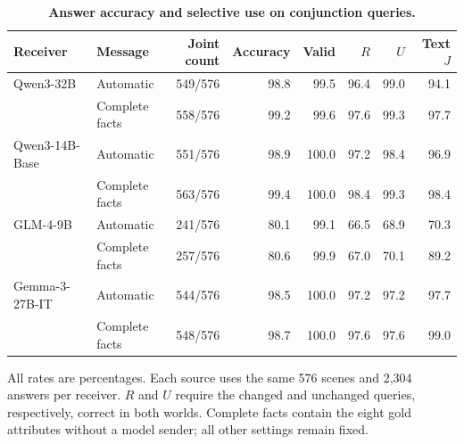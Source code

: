 \begin{table}[!htbp]
\caption{\textbf{Answer accuracy and selective use on conjunction queries.}}
\label{tab:wordif_conjunction_diagnostics}
\centering\small
\setlength{\tabcolsep}{3pt}\renewcommand{\arraystretch}{1.12}
\begin{tabular*}{\linewidth}{@{\extracolsep{\fill}}llrrrrrr@{}}
\toprule
Receiver & Message & \shortstack[r]{Joint\\count} & Accuracy & Valid & $R$ & $U$ & Text $J$ \\
\midrule
Qwen3-32B & Automatic & 549/576 & 98.8 & 99.5 & 96.4 & 99.0 & 94.1 \\
 & Complete facts & 558/576 & 99.2 & 99.6 & 97.6 & 99.3 & 97.7 \\
Qwen3-14B-Base & Automatic & 551/576 & 98.9 & 100.0 & 97.2 & 98.4 & 96.9 \\
 & Complete facts & 563/576 & 99.4 & 100.0 & 98.4 & 99.3 & 98.4 \\
GLM-4-9B & Automatic & 241/576 & 80.1 & 99.1 & 66.5 & 68.9 & 70.3 \\
 & Complete facts & 257/576 & 80.6 & 99.9 & 67.0 & 70.1 & 89.2 \\
Gemma-3-27B-IT & Automatic & 544/576 & 98.5 & 100.0 & 97.2 & 97.2 & 97.7 \\
 & Complete facts & 548/576 & 98.7 & 100.0 & 97.6 & 97.6 & 99.0 \\
\bottomrule
\end{tabular*}
\par\vspace{3pt}
{\footnotesize\raggedright All rates are percentages. Each source uses the same 576 scenes and 2,304 answers per receiver. $R$ and $U$ require the changed and unchanged queries, respectively, correct in both worlds. Complete facts contain the eight gold attributes without a model sender; all other settings remain fixed.\par}
\end{table}
